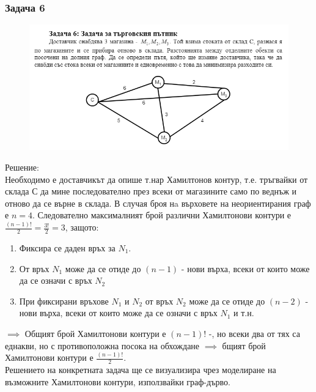\documentclass[fleqn, 12pt]{article}
\theoremstyle{definition}
\begin{document}
\subsubsection*{Задача 6}
\begin{figure} [htp!]
\includegraphics[width = \linewidth]{Pics/Discrete math/ex8/ex8-task6.png}
\end{figure}
Решение: \\
Необходимо е доставчикът да опише т.нар Хамилтонов контур, т.е. тръгвайки от склада С да мине последователно през всеки от магазините само по веднъж и отново да се върне в склада. В случая броя нa върховете на неориентирания граф е $n=4$. Следователно максималният брой различни Хамилтонови контури е $\frac{(n-1)!}{2} = \frac{3!}{2} = 3$, защото:
\begin{enumerate}
\item Фиксира се даден връх за $N_1$.
\item От връх $N_1$ може да се отиде до $(n-1)$ - нови върха, всеки от които може да се означи с връх $N_2$
\item При фиксирани връхове $N_1$ и $N_2$ от връх $N_2$ може да се отиде до $(n-2)$ - нови върха, всеки от които може да се означи с връх $N_1$ и т.н.
\end{enumerate}
$\implies$ Общият брой Хамилтонови контури е $(n-1)!$ -, но всеки два от тях са еднакви, но с противоположна посока на обхождане $\implies$ бщият брой Хамилтонови контури е $\frac{(n-1)!}{2}$.\\
Решението на конкретната задача ще се визуализира чрез моделиране на възможните Хамилтонови контури, използвайки граф-дърво.\\
\end{document}
